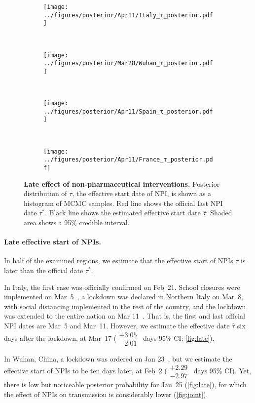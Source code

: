 \documentclass[12pt]{extarticle}
\begin{document}
\begin{figure}[h]
    \centering
    \begin{subfigure}{0.45\textwidth}
        \texttt{[image: ../figures/posterior/Apr11/Italy\_τ\_posterior.pdf]}
    \end{subfigure}
  	~
    \begin{subfigure}{0.45\textwidth}
        \texttt{[image: ../figures/posterior/Mar28/Wuhan\_τ\_posterior.pdf]}
    \end{subfigure}
    \\
    \begin{subfigure}{0.45\textwidth}
        \texttt{[image: ../figures/posterior/Apr11/Spain\_τ\_posterior.pdf]}
    \end{subfigure}
    ~
    \begin{subfigure}{0.45\textwidth}
		\texttt{[image: ../figures/posterior/Apr11/France\_τ\_posterior.pdf]}
    \end{subfigure}
    \caption{
	\textbf{Late effect of non-pharmaceutical interventions.}
    Posterior distribution of $\tau$, the effective start date of NPI, is shown as a histogram of MCMC samples. Red line shows the official last NPI date $\tau^*$. Black line shows the estimated effective start date $\hat{\tau}$. Shaded area shows a 95\% credible interval. 
    }
    \label{fig:late}
\end{figure}



\paragraph*{Late effective start of NPIs.}
In half of the examined regions, we estimate that the effective start of NPIs $\tau$ is later than the official date $\tau^*$.
 
In Italy, the first case was officially confirmed on Feb~21. School closures were implemented on Mar~5~\citep{Flaxman2020}, a lockdown was declared in Northern Italy on Mar~8, with social distancing implemented in the rest of the country, and the lockdown was extended to the entire nation on Mar 11~\citep{Gatto2020}.
That is, the first and last official NPI dates are Mar~5 and Mar~11.
However, we estimate the effective date $\hat{\tau}$ six days after the lockdown, at Mar~17 ($\substack{+3.05 \\ -2.01}$~days 95\% CI; \autoref{fig:late}). 

In Wuhan, China, a lockdown was ordered on Jan 23~\citep{Li2020}, but we estimate the effective start of NPIs to be ten days later, at Feb~2 ($\substack{+2.29 \\ -2.97}$~days 95\% CI). Yet, there is low but noticeable posterior probability for Jan~25 (\autoref{fig:late}), for which the effect of NPIs on transmission is considerably lower (\autoref{fig:joint}).
\end{document}
